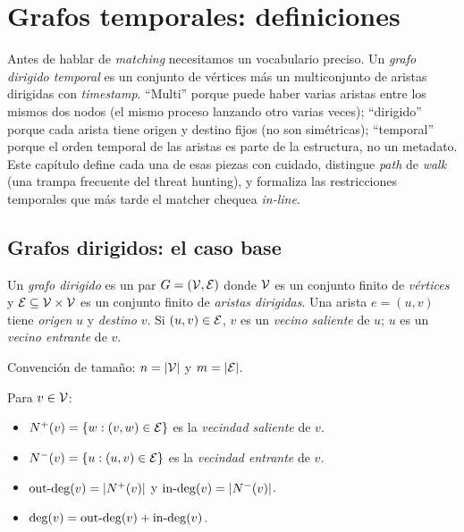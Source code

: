 \chapter{Grafos temporales: definiciones}
\label{cap:grafos-temporales}

\begin{intuicion}
Antes de hablar de \emph{matching} necesitamos un vocabulario
preciso. Un \emph{grafo dirigido temporal} es un conjunto de
vértices más un multiconjunto de aristas dirigidas con
\emph{timestamp}. ``Multi'' porque puede haber varias aristas entre
los mismos dos nodos (el mismo proceso lanzando otro varias veces);
``dirigido'' porque cada arista tiene origen y destino fijos (no son
simétricas); ``temporal'' porque el orden temporal de las aristas es
parte de la estructura, no un metadato. Este capítulo define cada
una de esas piezas con cuidado, distingue \emph{path} de \emph{walk}
(una trampa frecuente del threat hunting), y formaliza las
restricciones temporales que más tarde el matcher chequea
\emph{in-line}.
\end{intuicion}

\section{Grafos dirigidos: el caso base}

\begin{definition}
Un \emph{grafo dirigido} es un par \(G = (\mathcal{V}, \mathcal{E})\) donde \(\mathcal{V}\) es
un conjunto finito de \emph{vértices} y \(\mathcal{E} \subseteq \mathcal{V} \times \mathcal{V}\)
es un conjunto finito de \emph{aristas dirigidas}. Una arista
\(e = (u, v)\) tiene \emph{origen} \(u\) y \emph{destino} \(v\). Si
\((u, v) \in \mathcal{E}\), \(v\) es un \emph{vecino saliente} de \(u\); \(u\)
es un \emph{vecino entrante} de \(v\).
\end{definition}

\noindent
Convención de tamaño: \(n = |\mathcal{V}|\) y \(m = |\mathcal{E}|\).

\begin{definition}
Para \(v \in \mathcal{V}\):
\begin{itemize}
    \item \(N^{+}(v) = \{w : (v, w) \in \mathcal{E}\}\) es la \emph{vecindad
    saliente} de \(v\).
    \item \(N^{-}(v) = \{u : (u, v) \in \mathcal{E}\}\) es la \emph{vecindad
    entrante} de \(v\).
    \item \(\mathrm{out\text{-}deg}(v) = |N^{+}(v)|\) y \(\mathrm{in\text{-}deg}(v) = |N^{-}(v)|\).
    \item \(\deg(v) = \mathrm{out\text{-}deg}(v) + \mathrm{in\text{-}deg}(v)\).
\end{itemize}
\end{definition}

